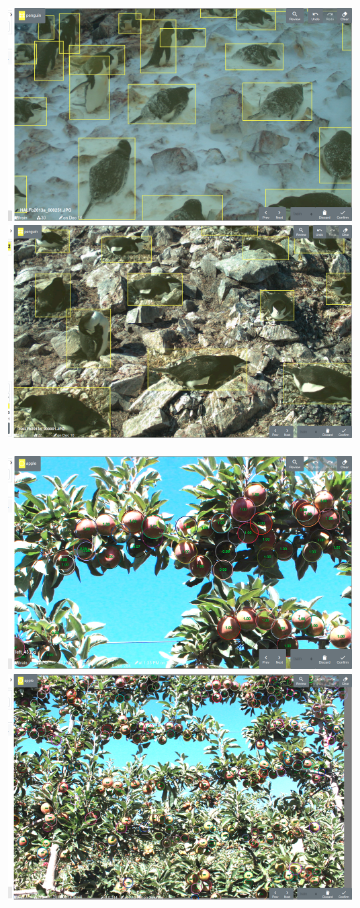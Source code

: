 \begin{figure}[h!]
\centering
\begin{subfigure}[t]{1.0\linewidth}
  \includegraphics[width=0.475\linewidth]{figures/annotation/screenshots/penguins.png}
  \hfill
  \includegraphics[width=0.475\linewidth]{figures/annotation/screenshots/penguins2.png}
  \caption{}
\end{subfigure}

\begin{subfigure}[t]{1.0\linewidth}
  \includegraphics[width=0.475\linewidth]{figures/annotation/screenshots/apples_big.png}
  \hfill
  \includegraphics[width=0.475\linewidth]{figures/annotation/screenshots/apples_small.png}
  \caption{}
\end{subfigure}



\end{figure}
